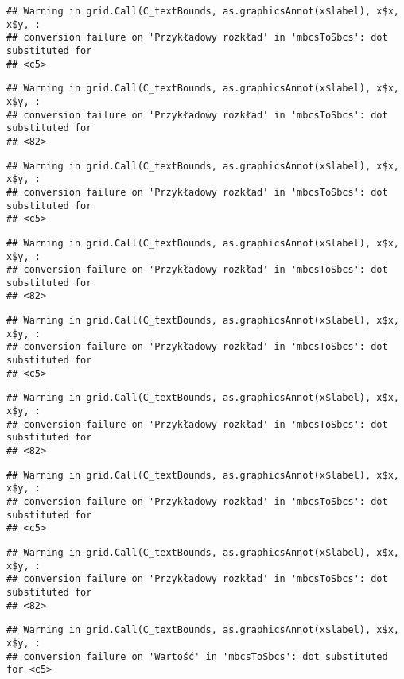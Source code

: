 \documentclass[
]{book}
\begin{document}
\begin{verbatim}
## Warning in grid.Call(C_textBounds, as.graphicsAnnot(x$label), x$x, x$y, :
## conversion failure on 'Przykładowy rozkład' in 'mbcsToSbcs': dot substituted for
## <c5>
\end{verbatim}

\begin{verbatim}
## Warning in grid.Call(C_textBounds, as.graphicsAnnot(x$label), x$x, x$y, :
## conversion failure on 'Przykładowy rozkład' in 'mbcsToSbcs': dot substituted for
## <82>
\end{verbatim}

\begin{verbatim}
## Warning in grid.Call(C_textBounds, as.graphicsAnnot(x$label), x$x, x$y, :
## conversion failure on 'Przykładowy rozkład' in 'mbcsToSbcs': dot substituted for
## <c5>
\end{verbatim}

\begin{verbatim}
## Warning in grid.Call(C_textBounds, as.graphicsAnnot(x$label), x$x, x$y, :
## conversion failure on 'Przykładowy rozkład' in 'mbcsToSbcs': dot substituted for
## <82>
\end{verbatim}

\begin{verbatim}
## Warning in grid.Call(C_textBounds, as.graphicsAnnot(x$label), x$x, x$y, :
## conversion failure on 'Przykładowy rozkład' in 'mbcsToSbcs': dot substituted for
## <c5>
\end{verbatim}

\begin{verbatim}
## Warning in grid.Call(C_textBounds, as.graphicsAnnot(x$label), x$x, x$y, :
## conversion failure on 'Przykładowy rozkład' in 'mbcsToSbcs': dot substituted for
## <82>
\end{verbatim}

\begin{verbatim}
## Warning in grid.Call(C_textBounds, as.graphicsAnnot(x$label), x$x, x$y, :
## conversion failure on 'Przykładowy rozkład' in 'mbcsToSbcs': dot substituted for
## <c5>
\end{verbatim}

\begin{verbatim}
## Warning in grid.Call(C_textBounds, as.graphicsAnnot(x$label), x$x, x$y, :
## conversion failure on 'Przykładowy rozkład' in 'mbcsToSbcs': dot substituted for
## <82>
\end{verbatim}

\begin{verbatim}
## Warning in grid.Call(C_textBounds, as.graphicsAnnot(x$label), x$x, x$y, :
## conversion failure on 'Wartość' in 'mbcsToSbcs': dot substituted for <c5>
\end{verbatim}
\end{document}
